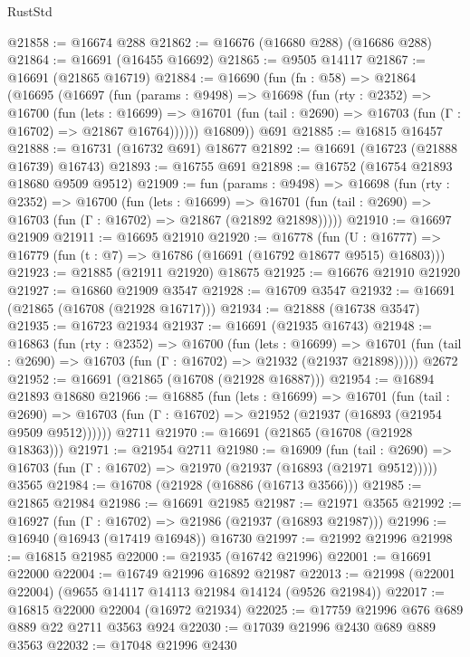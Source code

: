 \begin{lexlean}{RustStd}
\begin{coremodule}
@21858 := @16674 @288
@21862 := @16676 (@16680 @288) (@16686 @288)
@21864 := @16691 (@16455 @16692)
@21865 := @9505 @14117
@21867 := @16691 (@21865 @16719)
@21884 := @16690
    (fun (fn : @58) =>
    @21864
      (@16695
        (@16697
          (fun (params : @9498) =>
          @16698
            (fun (rty : @2352) =>
            @16700
              (fun (lets : @16699) =>
              @16701 (fun (tail : @2690) => @16703 (fun (Γ : @16702) => @21867 @16764))))))
        @16809))
    @691
@21885 := @16815 @16457
@21888 := @16731 (@16732 @691) @18677
@21892 := @16691 (@16723 (@21888 @16739) @16743)
@21893 := @16755 @691
@21898 := @16752 (@16754 @21893 @18680 @9509 @9512)
@21909 := fun (params : @9498) =>
  @16698
    (fun (rty : @2352) =>
    @16700
      (fun (lets : @16699) =>
      @16701 (fun (tail : @2690) => @16703 (fun (Γ : @16702) => @21867 (@21892 @21898)))))
@21910 := @16697 @21909
@21911 := @16695 @21910
@21920 := @16778
    (fun (U : @16777) => @16779 (fun (t : @7) => @16786 (@16691 (@16792 @18677 @9515) @16803)))
@21923 := @21885 (@21911 @21920) @18675
@21925 := @16676 @21910 @21920
@21927 := @16860 @21909 @3547
@21928 := @16709 @3547
@21932 := @16691 (@21865 (@16708 (@21928 @16717)))
@21934 := @21888 (@16738 @3547)
@21935 := @16723 @21934
@21937 := @16691 (@21935 @16743)
@21948 := @16863
    (fun (rty : @2352) =>
    @16700
      (fun (lets : @16699) =>
      @16701 (fun (tail : @2690) => @16703 (fun (Γ : @16702) => @21932 (@21937 @21898)))))
    @2672
@21952 := @16691 (@21865 (@16708 (@21928 @16887)))
@21954 := @16894 @21893 @18680
@21966 := @16885
    (fun (lets : @16699) =>
    @16701
      (fun (tail : @2690) =>
      @16703 (fun (Γ : @16702) => @21952 (@21937 (@16893 (@21954 @9509 @9512))))))
    @2711
@21970 := @16691 (@21865 (@16708 (@21928 @18363)))
@21971 := @21954 @2711
@21980 := @16909
    (fun (tail : @2690) => @16703 (fun (Γ : @16702) => @21970 (@21937 (@16893 (@21971 @9512)))))
    @3565
@21984 := @16708 (@21928 (@16886 (@16713 @3566)))
@21985 := @21865 @21984
@21986 := @16691 @21985
@21987 := @21971 @3565
@21992 := @16927 (fun (Γ : @16702) => @21986 (@21937 (@16893 @21987)))
@21996 := @16940 (@16943 (@17419 @16948)) @16730
@21997 := @21992 @21996
@21998 := @16815 @21985
@22000 := @21935 (@16742 @21996)
@22001 := @16691 @22000
@22004 := @16749 @21996 @16892 @21987
@22013 := @21998 (@22001 @22004) (@9655 @14117 @14113 @21984 @14124 (@9526 @21984))
@22017 := @16815 @22000 @22004 (@16972 @21934)
@22025 := @17759 @21996 @676 @689 @889 @22 @2711 @3563 @924
@22030 := @17039 @21996 @2430 @689 @889 @3563
@22032 := @17048 @21996 @2430

\end{coremodule}
\end{lexlean}
